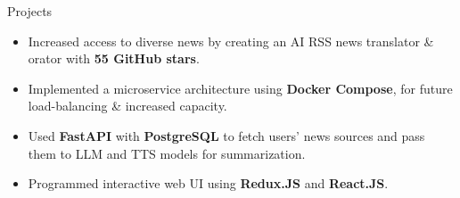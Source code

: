 \documentclass{resume} %
\begin{document}
\begin{workSection}{Projects}
	\customItem[
		title=\href{https://github.com/AshkanArabim/newsbridge}{Newsbridge \faExternalLink},
		duration=Team of 4 | September 2024 - December 2024,
	]
	\begin{itemize}
		\vspace{-0.5em}
		\itemsep -6pt {}
		\item Increased access to diverse news by creating an AI RSS news translator \& orator with \textbf{55 GitHub stars}.
		\item Implemented a microservice architecture using \textbf{Docker Compose}, for future load-balancing \& increased capacity.
		\item Used \textbf{FastAPI} with \textbf{PostgreSQL} to fetch users' news sources and pass them to LLM and TTS models for summarization.
		\item Programmed interactive web UI using \textbf{Redux.JS} and \textbf{React.JS}.
	\end{itemize}
	
	

\end{workSection}
\end{document}
